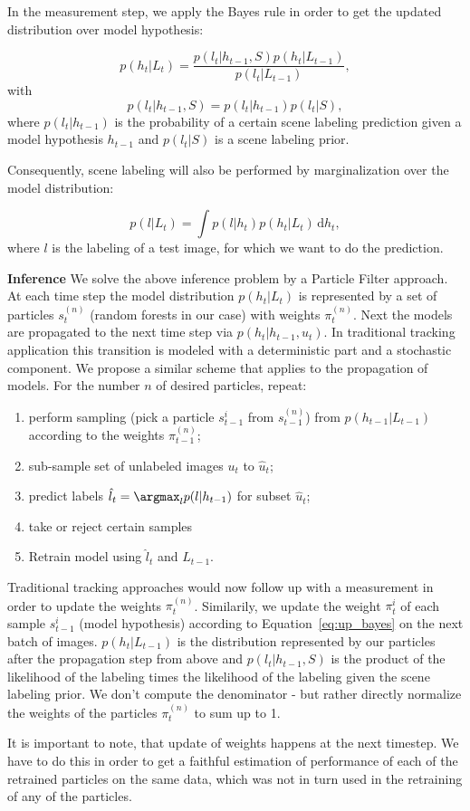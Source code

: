 In the measurement step, we apply the Bayes rule in order to get the updated distribution over model hypothesis:

\begin{equation}
p(h_t | L_t) = \frac{p(l_t|h_{t-1}, S) p(h_{t} | L_{t-1})}{p(l_t|L_{t-1})}, \label{eq:up_bayes}
\end{equation}
with
\begin{equation}
 p(l_t | h_{t-1},S) = p(l_t|h_{t-1}) p(l_t|S), 
\end{equation}
where $p(l_t | h_{t-1})$ is the probability of a certain scene labeling prediction given a model hypothesis $h_{t-1}$ and $p(l_t|S)$
is a scene labeling prior.

Consequently, scene labeling will also be performed by marginalization over the model distribution:

\begin{equation}
p(l|L_t) = \int p(l|h_t) p(h_t|L_t)\,\mathrm{d}h_t,
\end{equation}
where $l$ is the labeling of a test image, for which we want to do the prediction.

{\bf Inference} \quad We solve the above inference problem by a Particle Filter approach. At each time step the model distribution
$p(h_t|L_{t})$ is represented by a set of particles $s_t^{(n)}$ (random forests in our case) with weights $\pi_{t}^{(n)}$. Next 
the models are propagated to the next time step via $p(h_t | h_{t-1}, u_{t})$. In traditional tracking application this transition 
is modeled with a deterministic part and a stochastic component. We propose a similar scheme that applies to the propagation of models. 
For the number $n$ of desired particles, repeat:
\begin{enumerate}
\item perform sampling (pick a particle $s_{t-1}^{i}$ from $s_{t-1}^{(n)}$) from $p(h_{t-1}|L_{t-1})$ according to the weights $\pi_{t-1}^{(n)}$;
\item sub-sample set of unlabeled images $u_t$ to $\hat{u}_t$;
\item predict labels $\hat{l}_t = \argmax_l p(l | h_{t-1})$ for subset $\hat{u}_t$;
\item take or reject certain samples 
\item Retrain model using $\hat{l}_t$ and $L_{t-1}$.
\end{enumerate}

Traditional tracking approaches would now follow up with a measurement in order to update the weights $\pi_{t}^{(n)}$. Similarily, 
we update the weight $\pi_{t}^{i}$ of each sample $s_{t-1}^{i}$ (model hypothesis) according to Equation~\eqref{eq:up_bayes} on the next batch of images.
$p(h_t | L_{t-1})$ is 
the distribution represented by our particles after the propagation step from above and $p(l_t|h_{t-1}, S)$ is the product of the likelihood 
of the labeling times the likelihood of the labeling given the scene labeling prior. We don't compute the denominator - but rather directly 
normalize the weights of the particles $\pi_{t}^{(n)}$ to sum up to 1.

It is important to note, that update of weights happens at the next timestep.
We have to do this in order to get a faithful estimation of performance of each of
the retrained particles on the same data, which was not in turn used in the retraining
of any of the particles.